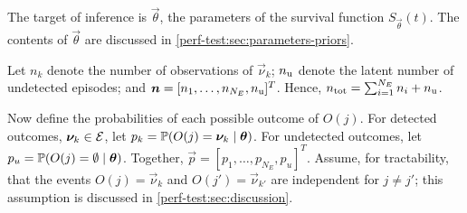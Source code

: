 \documentclass[thesis.tex]{subfiles}
\begin{document}
The target of inference is $\vec{\theta}$, the parameters of the survival function $S_{\vec{\theta}}(t)$.
The contents of $\vec{\theta}$ are discussed in \cref{perf-test:sec:parameters-priors}.

Let $n_k$ denote the number of observations of $\vec{\nu}_k$; $n_\text{u}$ denote the latent number of undetected episodes; and $\bm{n} = [n_1, \dots, n_{N_E}, n_\text{u}]^T$.
Hence, $n_\text{tot} = \sum_{i=1}^{N_E} n_i + n_\text{u}$.

Now define the probabilities of each possible outcome of $O(j)$.
For detected outcomes, \ie $\bm{\nu}_k \in \mathcal{E}$, let $p_k = \operatorname{\mathbb{P}}(O(j) = \bm{\nu}_k \mid \bm{\theta})$.
For undetected outcomes, let $p_u = \operatorname{\mathbb{P}}(O(j) = \emptyset \mid \bm{\theta})$.
Together, $\vec{p} = [p_1, \dots, p_{N_E}, p_u]^T$.
Assume, for tractability, that the events $O(j) = \vec{\nu}_k$ and $O(j') = \vec{\nu}_{k'}$ are independent for $j \neq j'$; this assumption is discussed in \cref{perf-test:sec:discussion}.
\end{document}
